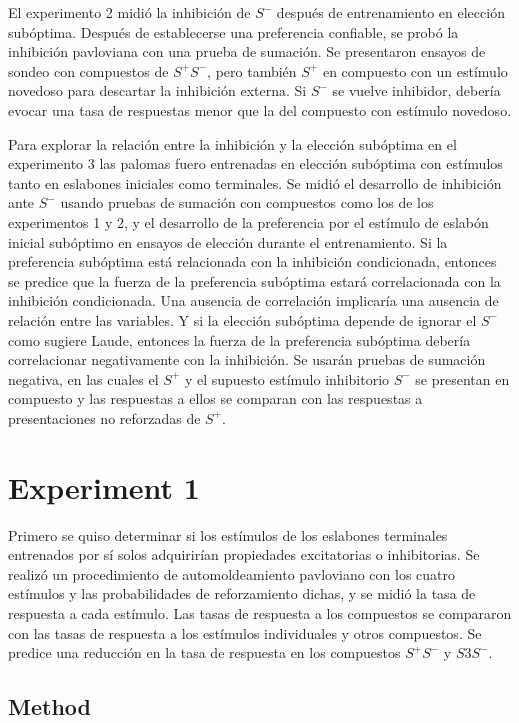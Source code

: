 \documentclass[a4paper,12pt]{article}
\begin{document}
El experimento 2 midió la inhibición de $S^{-}$ después de entrenamiento en elección subóptima.
Después de establecerse una preferencia confiable, se probó la inhibición pavloviana con una prueba de sumación.
Se presentaron ensayos de sondeo con compuestos de $S^{+}S^{-}$, pero también $S^{+}$ en compuesto con un estímulo novedoso para descartar la inhibición externa.
Si $S^{-}$ se vuelve inhibidor, debería evocar una tasa de respuestas menor que la del compuesto con estímulo novedoso.

Para explorar la relación entre la inhibición y la elección subóptima en el experimento 3 las palomas fuero entrenadas en elección subóptima con estímulos tanto en eslabones iniciales como terminales.
Se midió el desarrollo de inhibición ante $S^{-}$ usando pruebas de sumación con compuestos como los de los experimentos 1 y 2, y el desarrollo de la preferencia por el estímulo de eslabón inicial subóptimo en ensayos de elección durante el entrenamiento.
Si la preferencia subóptima está relacionada con la inhibición condicionada, entonces se predice que la fuerza de la preferencia subóptima estará correlacionada con la inhibición condicionada.
Una ausencia de correlación implicaría una ausencia de relación entre las variables.
Y si la elección subóptima depende de ignorar el $S^{-}$ como sugiere Laude, entonces la fuerza de la preferencia subóptima debería correlacionar negativamente con la inhibición.
Se usarán pruebas de sumación negativa, en las cuales el $S^{+}$ y el supuesto estímulo inhibitorio  $S^{-}$ se presentan en compuesto y las respuestas a ellos se comparan con las respuestas a presentaciones no reforzadas de $S^{+}$.

\section{Experiment 1}

Primero se quiso determinar si los estímulos de los eslabones terminales entrenados por sí solos adquirirían propiedades excitatorias o inhibitorias.
Se realizó un procedimiento de automoldeamiento pavloviano con los cuatro estímulos y las probabilidades de reforzamiento dichas, y se midió la tasa de respuesta a cada estímulo.
Las tasas de respuesta a los compuestos se compararon con las tasas de respuesta a los estímulos individuales y otros compuestos.
Se predice una reducción en la tasa de respuesta en los compuestos $S^{+}S^{-}$ y $S3S^{-}$.

\subsection{Method}
\end{document}

